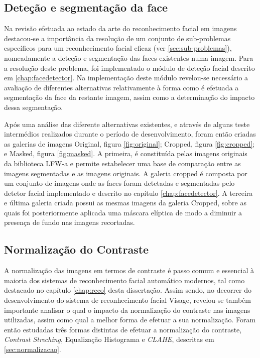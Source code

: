 \subsection{Deteção e segmentação da face}
Na revisão efetuada ao estado da arte do reconhecimento facial em imagens destacou-se a importância da resolução de um conjunto de sub-problemas específicos para um reconhecimento facial eficaz (ver \ref{sec:sub-problemas}), nomeadamente a deteção e segmentação das faces existentes numa imagem. Para a resolução deste problema, foi implementado o módulo de deteção facial descrito em \ref{chap:facedetector}. Na implementação deste módulo revelou-se necessário a avaliação de diferentes alternativas relativamente à forma como é efetuada a segmentação da face da restante imagem, assim como a determinação do impacto dessa segmentação. 

Após uma análise das diferente alternativas existentes, e através de alguns teste intermédios realizados durante o período de desenvolvimento, foram então criadas as galerias de imagens Original, figura \ref{fig:original}; Cropped, figura \ref{fig:cropped}; e Masked, figura \ref{fig:masked}. A primeira, é constituída pelas imagens originais da biblioteca LFW-a e permite estabelecer uma base de comparação entre as imagens segmentadas e as imagens originais. A galeria cropped é composta por um conjunto de imagens onde as faces foram detetadas e segmentadas pelo detetor facial implementado e descrito no capítulo \ref{chap:facedetector}. A terceira e última galeria criada possui as mesmas imagens da galeria Cropped, sobre as quais foi posteriormente aplicada uma máscara elíptica de modo a diminuir a presença de fundo nas imagens recortadas.

\subsection{Normalização do Contraste}
A normalização das imagens em termos de contraste é passo comum e essencial à maioria dos sistemas de reconhecimento facial automático modernos, tal como destacado no capítulo \ref{chap:reco} desta dissertação. Assim sendo, no decorrer do desenvolvimento do sistema de reconhecimento facial Visage, revelou-se também importante analisar o qual o impacto da normalização do contraste nas imagens utilizadas, assim como qual a melhor forma de efetuar a sua normalização. Foram então estudadas três formas distintas de efetuar a normalização do contraste, \textit{Contrast Streching}, Equalização Histograma e \textit{CLAHE}, descritas em \ref{sec:normalizacao}.


